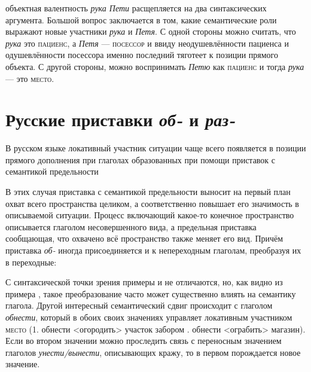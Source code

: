 

объектная валентность \textit{рука Пети} расщепляется на два синтаксических аргумента. Большой вопрос заключается в том, какие семантические роли выражают новые участники \textit{рука} и \textit{Петя}. С одной стороны можно считать, что \textit{рука} это \textsc{пациенс}, а \textit{Петя} --- \textsc{посессор} и ввиду неодушевлённости пациенса и одушевлённости посессора именно последний тяготеет к позиции прямого объекта. С другой стороны, можно воспринимать \textit{Петю} как \textsc{пациенс} и тогда \textit{рука} --- это \textsc{место}.

\section{Русские приставки \textit{об-} и \textit{раз-}}

В русском языке локативный участник ситуации чаще всего появляется в позиции прямого дополнения при глаголах образованных при помощи приставок с семантикой предельности

\vspace{-15pt}

\par В этих случая приставка с семантикой предельности выносит на первый план охват всего пространства целиком, а соответственно повышает его значимость в описываемой ситуации. Процесс включающий какое-то конечное пространство описывается глаголом несовершенного вида, а предельная приставка сообщающая, что охвачено всё пространство также меняет его вид. Причём приставка \textit{об-} иногда присоединяется и к непереходным глаголам, преобразуя их в переходные:


С синтаксической точки зрения примеры  и  не отличаются, но, как видно из примера , такое преобразование часто может существенно влиять на семантику глагола. Другой интересный семантический сдвиг происходит с глаголом \textit{обнести}, который в обоих своих значениях управляет локативным участником \textsc{место} (1. обнести  <огородить> участок забором \;. обнести <ограбить> магазин). Если во втором значении можно проследить связь с переносным значением глаголов \textit{унести/вынести}, описывающих кражу, то в первом порождается новое значение.


